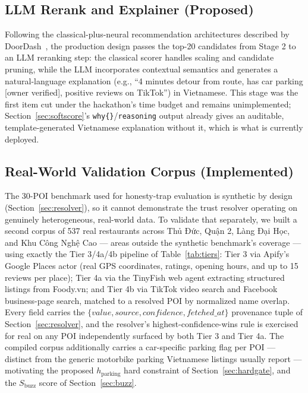 \documentclass[acmsmall,screen]{acmart}
\begin{document}
\subsection{LLM Rerank and Explainer (Proposed)}
Following the classical-plus-neural recommendation architectures described by DoorDash~\cite{doordashkdd}, the production design passes the top-20 candidates from Stage 2 to an LLM reranking step: the classical scorer handles scaling and candidate pruning, while the LLM incorporates contextual semantics and generates a natural-language explanation (e.g., ``4 minutes detour from route, has car parking [owner verified], positive reviews on TikTok'') in Vietnamese. This stage was the first item cut under the hackathon's time budget and remains unimplemented; Section~\ref{sec:softscore}'s \texttt{why\{\}}/\texttt{reasoning} output already gives an auditable, template-generated Vietnamese explanation without it, which is what is currently deployed.

\subsection{Real-World Validation Corpus (Implemented)}
\label{sec:realdata}
The 30-POI benchmark used for honesty-trap evaluation is synthetic by design (Section~\ref{sec:resolver}), so it cannot demonstrate the trust resolver operating on genuinely heterogeneous, real-world data. To validate that separately, we built a second corpus of 537 real restaurants across Thủ Đức, Quận 2, Làng Đại Học, and Khu Công Nghệ Cao — areas outside the synthetic benchmark's coverage — using exactly the Tier 3/4a/4b pipeline of Table~\ref{tab:tiers}: Tier 3 via Apify's Google Places actor (real GPS coordinates, ratings, opening hours, and up to 15 reviews per place); Tier 4a via the TinyFish web agent extracting structured listings from Foody.vn; and Tier 4b via TikTok video search and Facebook business-page search, matched to a resolved POI by normalized name overlap. Every field carries the $\{value, source, confidence, fetched\_at\}$ provenance tuple of Section~\ref{sec:resolver}, and the resolver's highest-confidence-wins rule is exercised for real on any POI independently surfaced by both Tier 3 and Tier 4a. The compiled corpus additionally carries a car-specific parking flag per POI — distinct from the generic motorbike parking Vietnamese listings usually report — motivating the proposed $h_{\text{parking}}$ hard constraint of Section~\ref{sec:hardgate}, and the $S_{\text{buzz}}$ score of Section~\ref{sec:buzz}.
\end{document}
